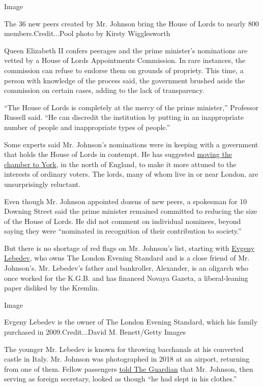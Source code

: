 Image

The 36 new peers created by Mr. Johnson bring the House of Lords to
nearly 800 members.Credit...Pool photo by Kirsty Wigglesworth

Queen Elizabeth II confers peerages and the prime minister's nominations
are vetted by a House of Lords Appointments Commission. In rare
instances, the commission can refuse to endorse them on grounds of
propriety. This time, a person with knowledge of the process said, the
government brushed aside the commission on certain cases, adding to the
lack of transparency.

``The House of Lords is completely at the mercy of the prime minister,''
Professor Russell said. ``He can discredit the institution by putting in
an inappropriate number of people and inappropriate types of people.''

Some experts said Mr. Johnson's nominations were in keeping with a
government that holds the House of Lords in contempt. He has suggested
\href{https://www.bbc.co.uk/news/uk-politics-53432776}{moving the
chamber to York}, in the north of England, to make it more attuned to
the interests of ordinary voters. The lords, many of whom live in or
near London, are unsurprisingly reluctant.

Even though Mr. Johnson appointed dozens of new peers, a spokesman for
10 Downing Street said the prime minister remained committed to reducing
the size of the House of Lords. He did not comment on individual
nominees, beyond saying they were ``nominated in recognition of their
contribution to society.''

But there is no shortage of red flags on Mr. Johnson's list, starting
with
\href{https://www.nytimes3xbfgragh.onion/2015/01/01/style/the-rise-of-evgeny-lebedev.html}{Evgeny
Lebedev}, who owns The London Evening Standard and is a close friend of
Mr. Johnson's. Mr. Lebedev's father and bankroller, Alexander, is an
oligarch who once worked for the K.G.B. and has financed Novaya Gazeta,
a liberal-leaning paper disliked by the Kremlin.

Image

Evgeny Lebedev is the owner of The London Evening Standard, which his
family purchased in 2009.Credit...David M. Benett/Getty Images

The younger Mr. Lebedev is known for throwing bacchanals at his
converted castle in Italy. Mr. Johnson was photographed in 2018 at an
airport, returning from one of them. Fellow passengers
\href{https://www.theguardian.com/politics/2019/jul/26/boris-johnson-security-evgeny-lebedev-perugia-party}{told
The Guardian} that Mr. Johnson, then serving as foreign secretary,
looked as though ``he had slept in his clothes.''

